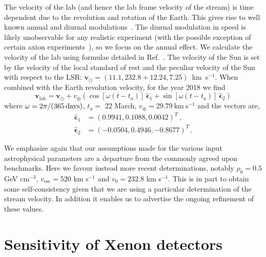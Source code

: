 \documentclass[prd,10pt,twocolumn,showpacs,nofootinbib,aps,superscriptaddress,preprintnumbers]{revtex4-1}
\newcommand{\epsa}{\hat{\boldsymbol{\epsilon}}_1}
\newcommand{\epsb}{\hat{\boldsymbol{\epsilon}}_2}
\newcommand{\vlab}{\mathbf{v}_\mathrm{lab}}
\newcommand{\vesc}{v_\mathrm{esc}}
\begin{document}
The velocity of the lab (and hence the lab frame velocity of the
stream) is time dependent due to the revolution and rotation of the
Earth. This gives rise to well known annual and diurnal
modulations~\cite{Drukier:1986tm, Freese:1987wu}. The diurnal
modulation in speed is likely unobservable for any realistic
experiment (with the possible exception of certain axion
experiments~\cite{Knirck:2018knd}), so we focus on the annual
effect. We calculate the velocity of the lab using formulae detailed
in Ref.~\cite{McCabe:2013kea, Mayet:2016zxu}. The velocity of the Sun
is set by the velocity of the local standard of rest and the peculiar
velocity of the Sun with respect to the LSR: $\textbf{v}_\odot =
(11.1,232.8+12.24,7.25)$~km~s$^{-1}$. When combined with the Earth
revolution velocity, for the year 2018 we find
%
\begin{equation}
\vlab = \mathbf{v}_\odot + v_\oplus \left( \cos[\omega(t-t_a)]\, \epsa + \sin[\omega (t-t_a)] \,\epsb \right)
\end{equation}
where $\omega = 2\pi/(365\,{\rm days})$, $t_a = $ 22 March, 
$v_\oplus = 29.79~\mathrm{km}~\mathrm{s}^{-1}$ and the vectors are,
\begin{align}
\epsa &= (0.9941, 0.1088, 0.0042)^T  \, , \\ 
\epsb &= (-0.0504, 0.4946, -0.8677)^T \, .
\end{align}

We emphasise again that our assumptions made for the various input
astrophysical parameters are a departure from the commonly agreed upon
benchmarks. Here we favour instead more recent determinations, notably
$\rho_0 = 0.5$ GeV cm$^{-3}$, $\vesc = 520$ km s$^{-1}$ and $v_0 =
232.8$ km s$^{-1}$. This is in part to obtain some self-consistency
given that we are using a particular determination of the stream
velocity. In addition it enables us to advertise the ongoing
refinement of these values.


\section{Sensitivity of Xenon detectors}\label{sec:xenon}
\end{document}
